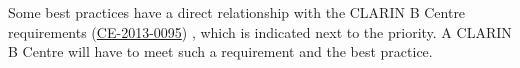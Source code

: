 
Some best practices have a direct relationship with the CLARIN B Centre requirements (\href{http://hdl.handle.net/11372/DOC-78}{CE-2013-0095}) \cite{ce20130095},
which is indicated next to the priority. A CLARIN B Centre will have to meet such a requirement and the best practice.
